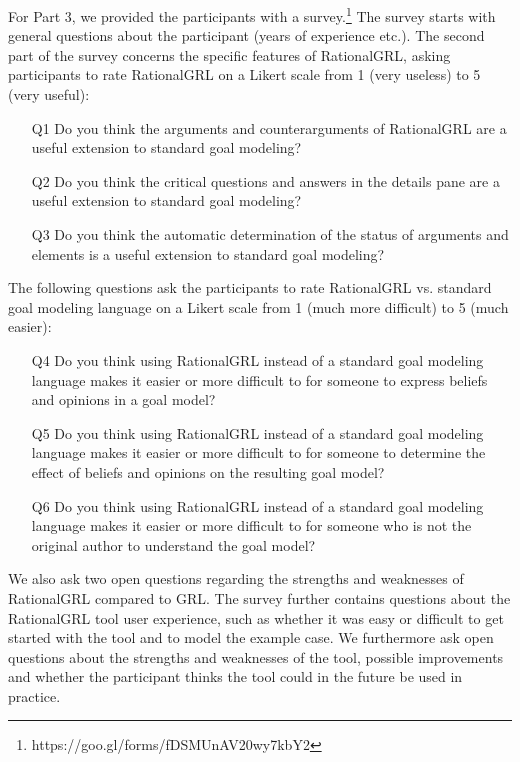 For Part 3, we provided the participants with a survey.\footnote{https://goo.gl/forms/fDSMUnAV20wy7kbY2} The survey starts with general questions about the participant (years of experience etc.). The second part of the survey concerns the specific features of RationalGRL, asking participants to rate RationalGRL on a Likert scale from 1 (very useless) to 5 (very useful):
\begin{itemize}
\item[Q1] Do you think the arguments and counterarguments of RationalGRL are a useful extension to standard goal modeling?
\item[Q2] Do you think the critical questions and answers in the details pane are a useful extension to standard goal modeling?
\item[Q3] Do you think the automatic determination of the status of arguments and elements is a useful extension to standard goal modeling?
\end{itemize}
The following questions ask the participants to rate RationalGRL vs. standard goal modeling language  on a Likert scale from 1 (much more difficult) to 5 (much easier):
\begin{itemize}
\item[Q4] Do you think using RationalGRL instead of a standard goal modeling language makes it easier or more difficult to for someone to express beliefs and opinions in a goal model?
\item[Q5] Do you think using RationalGRL instead of a standard goal modeling language makes it easier or more difficult to for someone to determine the effect of beliefs and opinions on the resulting goal model?
\item [Q6] Do you think using RationalGRL instead of a standard goal modeling language makes it easier or more difficult to for someone who is not the original author to understand the goal model? 
\end{itemize}
We also ask two open questions regarding the strengths and weaknesses of RationalGRL compared to GRL. The survey further contains questions about the RationalGRL tool user experience, such as whether it was easy or difficult to get started with the tool and to model the example case. We furthermore ask open questions about the strengths and weaknesses of the tool, possible improvements and whether the participant thinks the tool could in the future be used in practice. 

